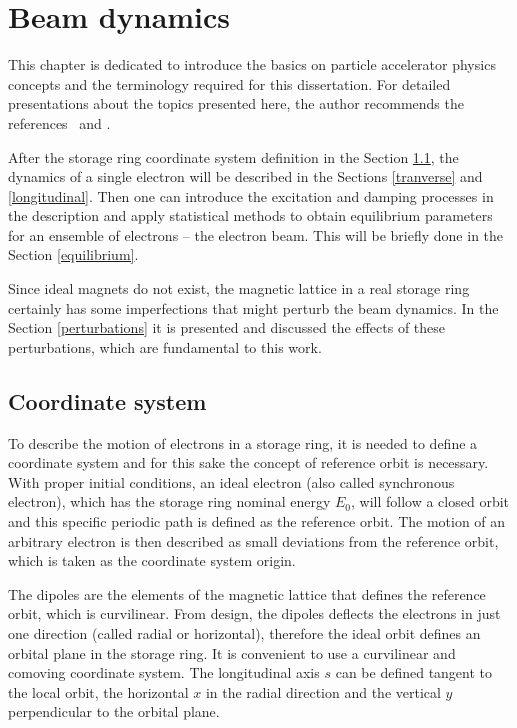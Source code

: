 \chapter{Beam dynamics}

This chapter is dedicated to introduce the basics on particle accelerator physics concepts and the terminology required for this dissertation. For detailed presentations about the topics presented here, the author recommends the references~\cite{sands1970physics} and \cite{wiedemann2007physics}.

After the storage ring coordinate system definition in the Section \ref{coord}, the dynamics of a single electron will be described in the Sections \ref{tranverse} and \ref{longitudinal}. Then one can introduce the excitation and damping processes in the description and apply statistical methods to obtain equilibrium parameters for an ensemble of electrons -- the electron beam. This will be briefly done in the Section \ref{equilibrium}.

Since ideal magnets do not exist, the magnetic lattice in a real storage ring certainly has some imperfections that might perturb the beam dynamics. In the Section \ref{perturbations} it is presented and discussed the effects of these perturbations, which are fundamental to this work.

\section{Coordinate system}\label{coord}

To describe the motion of electrons in a storage ring, it is needed to define a coordinate system and for this sake the concept of reference orbit is necessary. With proper initial conditions, an ideal electron (also called synchronous electron), which has the storage ring nominal energy $E_0$, will follow a closed orbit and this specific periodic path is defined as the reference orbit. The motion of an arbitrary electron is then described as small deviations from the reference orbit, which is taken as the coordinate system origin. 

The dipoles are the elements of the magnetic lattice that defines the reference orbit, which is curvilinear. From design, the dipoles deflects the electrons in just one direction (called radial or horizontal), therefore the ideal orbit defines an orbital plane in the storage ring. It is convenient to use a curvilinear and comoving coordinate system. The longitudinal axis $s$ can be defined tangent to the local orbit, the horizontal $x$ in the radial direction and the vertical $y$ perpendicular to the orbital plane.


